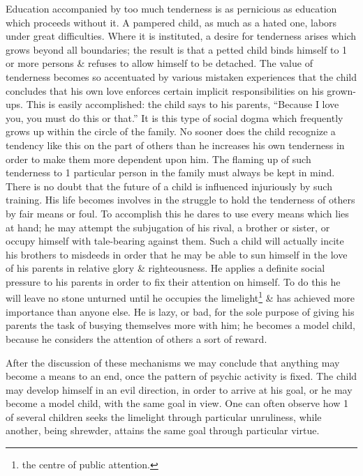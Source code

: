 \documentclass{article}
\begin{document}
Education accompanied by too much tenderness is as pernicious as education which proceeds without it. A pampered child, as much as a hated one, labors under great difficulties. Where it is instituted, a desire for tenderness arises which grows beyond all boundaries; the result is that a petted child binds himself to 1 or more persons \& refuses to allow himself to be detached. The value of tenderness becomes so accentuated by various mistaken experiences that the child concludes that his own love enforces certain implicit responsibilities on his grown-ups. This is easily accomplished: the child says to his parents, ``Because I love you, you must do this or that.'' It is this type of social dogma which frequently grows up within the circle of the family. No sooner does the child recognize a tendency like this on the part of others than he increases his own tenderness in order to make them more dependent upon him. The flaming up of such tenderness to 1 particular person in the family must always be kept in mind. There is no doubt that the future of a child is influenced injuriously by such training. His life becomes involves in the struggle to hold the tenderness of others by fair means or foul. To accomplish this he dares to use every means which lies at hand; he may attempt the subjugation of his rival, a brother or sister, or occupy himself with tale-bearing against them. Such a child will actually incite his brothers to misdeeds in order that he may be able to sun himself in the love of his parents in relative glory \& righteousness. He applies a definite social pressure to his parents in order to fix their attention on himself. To do this he will leave no stone unturned until he occupies the limelight\footnote{the centre of public attention.} \& has achieved more importance than anyone else. He is lazy, or bad, for the sole purpose of giving his parents the task of busying themselves more with him; he becomes a model child, because he considers the attention of others a sort of reward.

After the discussion of these mechanisms we may conclude that anything may become a means to an end, once the pattern of psychic activity is fixed. The child may develop himself in an evil direction, in order to arrive at his goal, or he may become a model child, with the same goal in view. One can often observe how 1 of several children seeks the limelight through particular unruliness, while another, being shrewder, attains the same goal through particular virtue.
\end{document}
